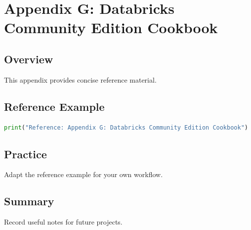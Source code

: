 \chapter{Appendix G: Databricks Community Edition Cookbook}
\label{chap:vol12-7}



\section{Overview}
This appendix provides concise reference material.

\section{Reference Example}
\begin{lstlisting}[language=Python]
print("Reference: Appendix G: Databricks Community Edition Cookbook")
\end{lstlisting}

\section{Practice}
\begin{exercise}
Adapt the reference example for your own workflow.
\end{exercise}

\section{Summary}
Record useful notes for future projects.
